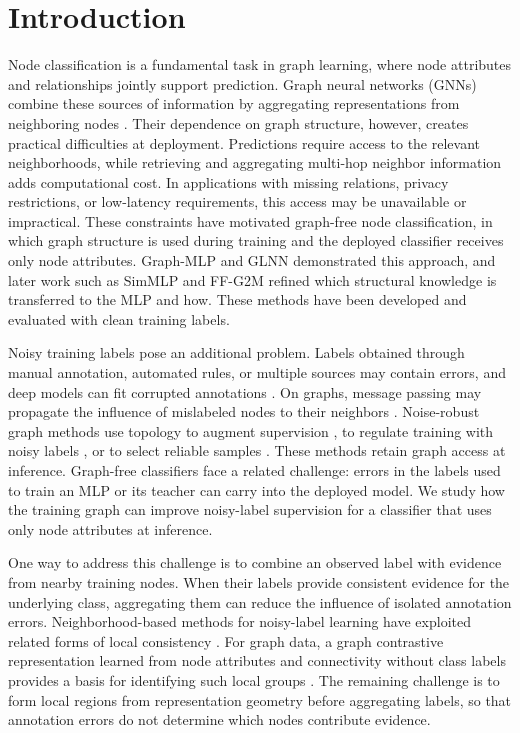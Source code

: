 \documentclass[10pt,letterpaper,nopreprintline]{elsarticle}
\theoremstyle{plain}
\begin{document}
\FloatBarrier

\section{Introduction}\label{sec:1}

Node classification is a fundamental task in graph learning, where node attributes and relationships jointly support prediction. Graph neural networks (GNNs) combine these sources of information by aggregating representations from neighboring nodes \cite{ref1,ref2}. Their dependence on graph structure, however, creates practical difficulties at deployment. Predictions require access to the relevant neighborhoods, while retrieving and aggregating multi-hop neighbor information adds computational cost. In applications with missing relations, privacy restrictions, or low-latency requirements, this access may be unavailable or impractical. These constraints have motivated graph-free node classification, in which graph structure is used during training and the deployed classifier receives only node attributes. Graph-MLP \cite{ref3} and GLNN \cite{ref4} demonstrated this approach, and later work such as SimMLP \cite{ref41} and FF-G2M \cite{ref45} refined which structural knowledge is transferred to the MLP and how. These methods have been developed and evaluated with clean training labels.

Noisy training labels pose an additional problem. Labels obtained through manual annotation, automated rules, or multiple sources may contain errors, and deep models can fit corrupted annotations \cite{ref5}. On graphs, message passing may propagate the influence of mislabeled nodes to their neighbors \cite{ref6}. Noise-robust graph methods use topology to augment supervision \cite{ref7}, to regulate training with noisy labels \cite{ref8}, or to select reliable samples \cite{ref9}. These methods retain graph access at inference. Graph-free classifiers face a related challenge: errors in the labels used to train an MLP or its teacher can carry into the deployed model. We study how the training graph can improve noisy-label supervision for a classifier that uses only node attributes at inference.

One way to address this challenge is to combine an observed label with evidence from nearby training nodes. When their labels provide consistent evidence for the underlying class, aggregating them can reduce the influence of isolated annotation errors. Neighborhood-based methods for noisy-label learning have exploited related forms of local consistency \cite{ref10,ref11}. For graph data, a graph contrastive representation learned from node attributes and connectivity without class labels provides a basis for identifying such local groups \cite{ref12}. The remaining challenge is to form local regions from representation geometry before aggregating labels, so that annotation errors do not determine which nodes contribute evidence.
\end{document}
